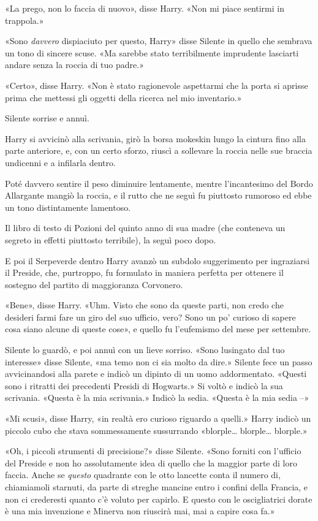 «La prego, non lo faccia di nuovo», disse Harry. «Non mi piace sentirmi in trappola.»

«Sono \textit{davvero} dispiaciuto per questo, Harry» disse Silente in quello che sembrava un tono di sincere scuse. «Ma sarebbe stato terribilmente imprudente lasciarti andare senza la roccia di tuo padre.»

«Certo», disse Harry. «Non è stato ragionevole aspettarmi che la porta si aprisse prima che mettessi gli oggetti della ricerca nel mio inventario.»

Silente sorrise e annuì.

Harry si avvicinò alla scrivania, girò la borsa mokeskin lungo la cintura fino alla parte anteriore, e, con un certo sforzo, riuscì a sollevare la roccia nelle sue braccia undicenni e a infilarla dentro.

Poté davvero sentire il peso diminuire lentamente, mentre l’incantesimo del Bordo Allargante mangiò la roccia, e il rutto che ne seguì fu piuttosto rumoroso ed ebbe un tono distintamente lamentoso.

Il libro di testo di Pozioni del quinto anno di sua madre (che conteneva un segreto in effetti piuttosto terribile), la seguì poco dopo.

E poi il Serpeverde dentro Harry avanzò un subdolo suggerimento per ingraziarsi il Preside, che, purtroppo, fu formulato in maniera perfetta per ottenere il sostegno del partito di maggioranza Corvonero.

«Bene», disse Harry. «Uhm. Visto che sono da queste parti, non credo che desideri farmi fare un giro del suo ufficio, vero? Sono un po’ curioso di sapere cosa siano alcune di queste cose», e quello fu l’eufemismo del mese per settembre.

Silente lo guardò, e poi annuì con un lieve sorriso. «Sono lusingato dal tuo interesse» disse Silente, «ma temo non ci sia molto da dire.» Silente fece un passo avvicinandosi alla parete e indicò un dipinto di un uomo addormentato. «Questi sono i ritratti dei precedenti Presidi di Hogwarts.» Si voltò e indicò la sua scrivania. «Questa è la mia scrivania.» Indicò la sedia. «Questa è la mia sedia –»

«Mi scusi», disse Harry, «in realtà ero curioso riguardo a quelli.» Harry indicò un piccolo cubo che stava sommessamente sussurrando «blorple… blorple… blorple.»

«Oh, i piccoli strumenti di precisione?» disse Silente. «Sono forniti con l’ufficio del Preside e non ho assolutamente idea di quello che la maggior parte di loro faccia. Anche se \textit{questo} quadrante con le otto lancette conta il numero di, chiamiamoli starnuti, da parte di streghe mancine entro i confini della Francia, e non ci crederesti quanto c’è voluto per capirlo. E questo con le oscigliatrici dorate è una mia invenzione e Minerva non riuscirà mai, mai a capire cosa fa.»

